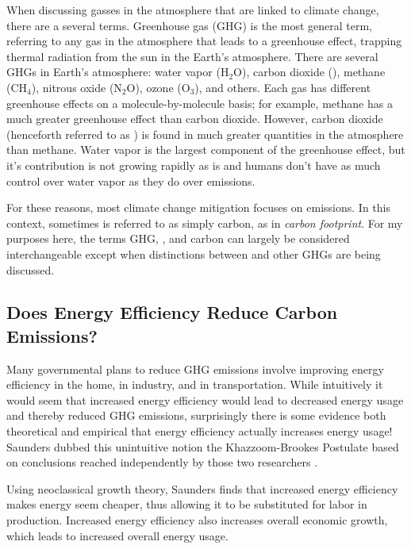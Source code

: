 When discussing gasses in the atmosphere that are linked to climate change, there are a several terms. Greenhouse gas (GHG) is the most general term, referring to any gas in the atmosphere that leads to a greenhouse effect, trapping thermal radiation from the sun in the Earth's atmosphere. There are several GHGs in Earth's atmosphere: water vapor (H$_2$O), carbon dioxide (\COtwo), methane (CH$_4$), nitrous oxide (N$_2$O), ozone (O$_3$), and others. Each gas has different greenhouse effects on a molecule-by-molecule basis; for example, methane has a much greater greenhouse effect than carbon dioxide.  However, carbon dioxide (henceforth referred to as \COtwo) is found in much greater quantities in the atmosphere than methane. Water vapor is the largest component of the greenhouse effect, but it's contribution is not growing rapidly as \COtwo is and humans don't have as much control over water vapor as they do over \COtwo emissions.

For these reasons, most climate change mitigation focuses on \COtwo emissions. In this context, sometimes \COtwo is referred to as simply carbon, as in \emph{carbon footprint}. For my purposes here, the terms GHG, \COtwo, and carbon can largely be considered interchangeable except when distinctions between \COtwo and other GHGs are being discussed.

\subsection{Does Energy Efficiency Reduce Carbon Emissions?}

Many governmental plans to reduce GHG emissions involve improving energy efficiency in the home, in industry, and in transportation. While intuitively it would seem that increased energy efficiency would lead to decreased energy usage and thereby reduced GHG emissions, surprisingly there is some evidence both theoretical and empirical that energy efficiency actually increases energy usage! Saunders dubbed this unintuitive notion the Khazzoom-Brookes Postulate based on conclusions reached independently by those two researchers \cite{saunders-1992}. 

Using neoclassical growth theory, Saunders finds that increased energy efficiency makes energy seem cheaper, thus allowing it to be substituted for labor in production. Increased energy efficiency also increases overall economic growth, which leads to increased overall energy usage.

